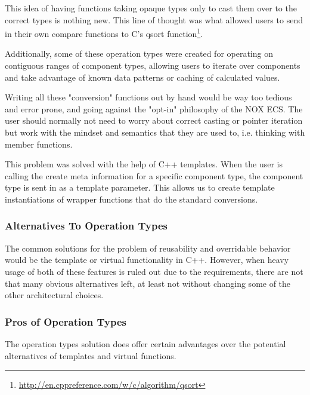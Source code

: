 This idea of having functions taking opaque types only to cast them over to the correct types is nothing new.
This line of thought was what allowed users to send in their own compare functions to C's qsort function\footnote{\url{http://en.cppreference.com/w/c/algorithm/qsort}}.

Additionally, some of these operation types were created for operating on contiguous ranges of component types,
allowing users to iterate over components and take advantage of known data patterns or caching of calculated values.

Writing all these "conversion" functions out by hand would be way too tedious and error prone, and going against the "opt-in" philosophy of the NOX ECS.
The user should normally not need to worry about correct casting or pointer iteration but work with the mindset and semantics that they are used to, i.e. thinking with member functions.

This problem was solved with the help of C++ templates. 
When the user is calling the create meta information for a specific component type,
the component type is sent in as a template parameter.
This allows us to create template instantiations of wrapper functions that do the standard conversions.

\subsubsection{Alternatives To Operation Types}
The common solutions for the problem of reusability and overridable behavior would be the template or virtual functionality in C++.
However, when heavy usage of both of these features is ruled out due to the requirements, there are not that many obvious alternatives left, at least not without changing some of the other architectural choices.

\subsubsection{Pros of Operation Types}
The operation types solution does offer certain advantages over the potential alternatives of templates and virtual functions.


